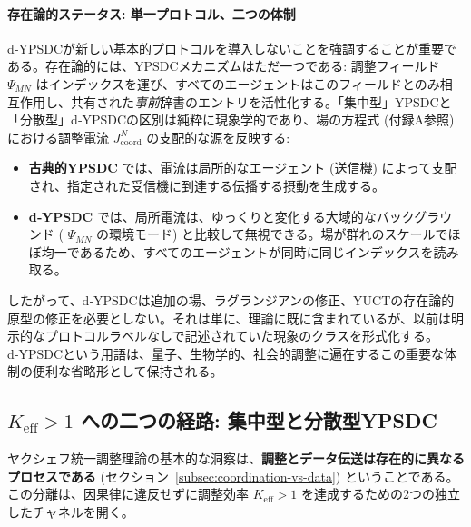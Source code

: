 \documentclass[11pt,a4paper]{article}
\begin{document}
	\paragraph*{存在論的ステータス: 単一プロトコル、二つの体制}
	
	d‑YPSDCが新しい基本的プロトコルを導入しないことを強調することが重要である。存在論的には、YPSDCメカニズムはただ一つである: 調整フィールド $\Psi_{MN}$ はインデックスを運び、すべてのエージェントはこのフィールドとのみ相互作用し、共有された\emph{事前}辞書のエントリを活性化する。「集中型」YPSDCと「分散型」d‑YPSDCの区別は純粋に現象学的であり、場の方程式 (付録A参照) における調整電流 $J^{N}_{\mathrm{coord}}$ の支配的な源を反映する:
	\begin{itemize}[leftmargin=*]
		\item \textbf{古典的YPSDC} では、電流は局所的なエージェント (送信機) によって支配され、指定された受信機に到達する伝播する摂動を生成する。
		\item \textbf{d‑YPSDC} では、局所電流は、ゆっくりと変化する大域的なバックグラウンド ( $\Psi_{MN}$ の環境モード) と比較して無視できる。場が群れのスケールでほぼ均一であるため、すべてのエージェントが同時に同じインデックスを読み取る。
	\end{itemize}
	したがって、d‑YPSDCは追加の場、ラグランジアンの修正、YUCTの存在論的原型の修正を必要としない。それは単に、理論に既に含まれているが、以前は明示的なプロトコルラベルなしで記述されていた現象のクラスを形式化する。d‑YPSDCという用語は、量子、生物学的、社会的調整に遍在するこの重要な体制の便利な省略形として保持される。
	
	\subsection{$K_{\mathrm{eff}} > 1$ への二つの経路: 集中型と分散型YPSDC}
	\label{subsec:two-paths}
	
	ヤクシェフ統一調整理論の基本的な洞察は、\textbf{調整とデータ伝送は存在的に異なるプロセスである} (セクション~\ref{subsec:coordination-vs-data}) ということである。この分離は、因果律に違反せずに調整効率 $K_{\mathrm{eff}} > 1$ を達成するための2つの独立したチャネルを開く。
	
\end{document}
